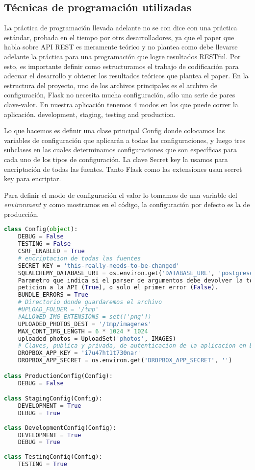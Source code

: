 \subsection{Técnicas de programación utilizadas}

La práctica de programación llevada adelante no se con dice con una práctica estándar, probada en el tiempo por otrs desarrolladores, ya que el paper que habla sobre API REST es meramente teórico y no plantea como debe llevarse adelante la práctica para una programación que logre resultados RESTful. Por esto, es importante definir como estructuramos el trabajo de codificación para adecuar el desarrollo y obtener los resultados teóricos que plantea el paper.
En la estructura del proyecto, uno de los archivos principales es el archivo de configuración, Flask no necesita mucha configuración, sólo una serie de pares clave-valor. En nuestra aplicación tenemos 4 modos en los que puede correr la aplicación. development, staging, testing and production.

Lo que hacemos es definir una clase principal Config donde colocamos las variables de configuración que aplicarán a todas las configuraciones, y luego tres subclases en las cuales determinamos configuraciones que son específicas para cada uno de los tipos de configuración. La clave Secret key la usamos para encriptación de todas las fuentes. Tanto Flask como las extensiones usan secret key para encriptar.

Para definir el modo de configuración el valor lo tomamos de una variable del \textit{environment} y como mostramos en el código, la configuración por defecto es la de producción.
    
\begin{lstlisting}[language=Python]
class Config(object):
    DEBUG = False
    TESTING = False
    CSRF_ENABLED = True
    # encriptacion de todas las fuentes
    SECRET_KEY = 'this-really-needs-to-be-changed'
    SQLALCHEMY_DATABASE_URI = os.environ.get('DATABASE_URL', 'postgresql:///salud_dev?client_encoding=utf8')
    Parametro que indica si el parser de argumentos debe devolver la totalidad de los errores encontrados en una
    peticion a la API (True), o solo el primer error (False).
    BUNDLE_ERRORS = True
    # Directorio donde guardaremos el archivo
    #UPLOAD_FOLDER = '/tmp'
    #ALLOWED_IMG_EXTENSIONS = set(['png'])
    UPLOADED_PHOTOS_DEST = '/tmp/imagenes'
    MAX_CONT_IMG_LENGTH = 6 * 1024 * 1024
    uploaded_photos = UploadSet('photos', IMAGES)
    # Claves, publica y privada, de autenticacion de la aplicacion en Dropbox.
    DROPBOX_APP_KEY = 'i7u47ht1t730nar'
    DROPBOX_APP_SECRET = os.environ.get('DROPBOX_APP_SECRET', '')

class ProductionConfig(Config):
    DEBUG = False

class StagingConfig(Config):
    DEVELOPMENT = True
    DEBUG = True
    
class DevelopmentConfig(Config):
    DEVELOPMENT = True
    DEBUG = True
    
class TestingConfig(Config):
    TESTING = True
\end{lstlisting}

